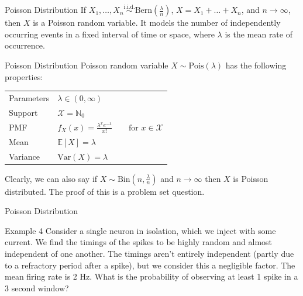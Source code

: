 \documentclass[10pt]{beamer}
\begin{document}
\begin{frame}[fragile]{Poisson Distribution}
If \(X_1, \dots, X_n \overset{\textrm{i.i.d.}}{\sim} \textrm{Bern}\left(\frac{\lambda}{n}\right)\), \(X = X_1 + \dots + X_n\), and \(n \rightarrow \infty\), then \(X\) is a Poisson random variable. It models the number of independently occurring events in a fixed interval of time or space, where \(\lambda\) is the mean rate of occurrence.

\begin{alertblock}{Poisson Distribution}
Poisson random variable \(X \sim \mathrm{Pois}\left(\lambda\right)\) has the following properties:
  \begin{table}
    \begin{tabular}{ll}
      \toprule
      Parameters & \(\lambda \in \left(0, \infty\right)\)\\
      Support & \(\mathcal{X} = \mathbb{N}_0\)\\
      PMF & \(f_X\left(x\right) = \frac{\lambda^x e^{-\lambda}}{x!}\qquad\textrm{for }x \in \mathcal{X}\)\\
      Mean & \(\mathbb{E}\left[X\right] = \lambda\)\\
      Variance & \(\textrm{Var}\left(X\right) = \lambda\)\\
      \bottomrule
    \end{tabular}
  \end{table}
\end{alertblock}

Clearly, we can also say if \(X \sim \textrm{Bin}\left(n, \frac{\lambda}{n}\right)\) and \(n \rightarrow \infty\) then \(X\) is Poisson distributed. The proof of this is a problem set question.
\end{frame}

\begin{frame}[fragile]{Poisson Distribution}
\begin{exampleblock}{Example 4}
Consider a single neuron in isolation, which we inject with some current. We find the timings of the spikes to be highly random and almost independent of one another. The timings aren't entirely independent (partly due to a refractory period after a spike), but we consider this a negligible factor. The mean firing rate is 2 Hz. What is the probability of observing at least 1 spike in a 3 second window?
\end{exampleblock}
\end{frame}
\end{document}
